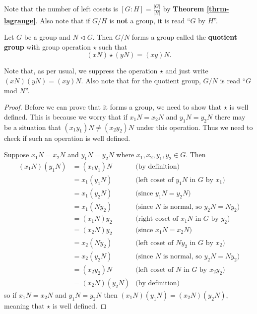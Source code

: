 Note that the number of left cosets is $[G:H] = \frac{|G|}{|H|}$ by \textbf{Theorem \ref{thrm-lagrange}}. Also note that if $G/H$ is \textbf{not} a group, it is read ``$G$ by $H$''.

\begin{theorem}\label{thrm-quotient-group-requirement}
    Let $G$ be a group and $N \lhd G$. Then $G / N$ forms a group called the \textbf{quotient group} with group operation $\star$ such that
    \[
        (xN) \star (yN) = (xy)N.
    \]
\end{theorem}
Note that, as per usual, we suppress the operation $\star$ and just write $(xN)(yN) = (xy)N$. Also note that for the quotient group, $G / N$ is read ``$G$ mod $N$''.
\begin{proof}
    Before we can prove that it forms a group, we need to show that $\star$ is well defined. This is because we worry that if $x_1N = x_2N$ and $y_1N = y_2N$ there may be a situation that $(x_1y_1)N \neq (x_2y_2)N$ under this operation. Thus we need to check if such an operation is well defined.

    Suppose $x_1N = x_2N$ and $y_1N = y_2N$ where $x_1, x_2, y_1, y_2 \in G$. Then
    \begin{align*}
        (x_1N)(y_1N) &= (x_1y_1)N & \text{(by definition)}\\
        &= x_1(y_1N) & \text{(left coset of } y_1N \text{ in } G \text{ by } x_1 \text{)}\\
        &= x_1(y_2N) & \text{(since } y_1N = y_2N \text{)}\\
        &= x_1(Ny_2) & \text{(since } N \text{ is normal, so } y_2N=Ny_2 \text{)}\\
        &= (x_1N)y_2 & \text{(right coset of } x_1N \text{ in } G \text{ by } y_2 \text{)}\\
        &= (x_2N)y_2 & \text{(since } x_1N = x_2N \text{)}\\
        &= x_2(Ny_2) & \text{(left coset of } Ny_2 \text{ in } G \text{ by } x_2 \text{)}\\
        &= x_2(y_2N) & \text{(since } N \text{ is normal, so } y_2N=Ny_2 \text{)}\\
        &= (x_2y_2)N & \text{(left coset of } N \text{ in } G \text{ by } x_2y_2 \text{)}\\
        &= (x_2N)(y_2N) & \text{(by definition)}
    \end{align*}
    so if $x_1N = x_2N$ and $y_1N = y_2N$ then $(x_1N)(y_1N) = (x_2N)(y_2N)$, meaning that $\star$ is well defined.


\end{proof}
